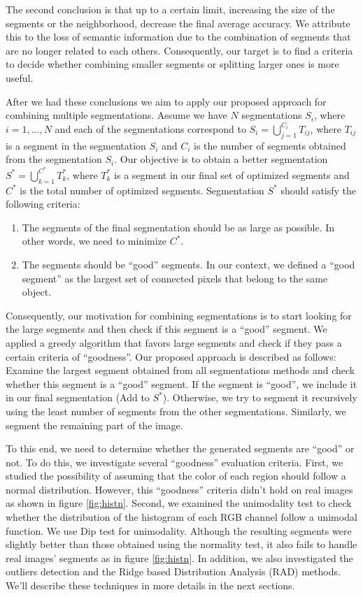 \documentclass{llncs}
\begin{document}
The second conclusion is that up to a certain limit, increasing the size of the segments or the neighborhood,
decrease the final average accuracy. We attribute this to the loss of semantic information due to the combination
of segments that are no longer related to each others. Consequently, our target is to find a criteria to decide
whether combining smaller segments or splitting larger ones is more useful.

After we had these conclusions we aim to apply our proposed approach for combining multiple segmentations.
Assume we have $N$ segmentations $S_i$, where $i = 1, ..., N$ and each of the segmentations correspond to
$S_i = \bigcup_{j=1}^{C_i}T_{ij}$, where $T_{ij}$ is a segment in the segmentation $S_i$ and $C_i$ is the number
of segments obtained from the segmentation $S_i$. Our objective is to obtain a better segmentation
$S^* = \bigcup_{k=1}^{C^*}T_k^*$, where $T^*_k$ is a segment in our final set of optimized segments and
$C^*$ is the total number of optimized segments. Segmentation $S^*$ should satisfy the following criteria:

\begin{enumerate}
\item
The segments of the final segmentation should be as large as possible. In other words, we need to minimize $C^*$.
\item
The segments should be ``good'' segments. In our context, we defined a ``good segment'' as the largest set of
connected pixels that belong to the same object.
\end{enumerate}

Consequently, our motivation for combining segmentations is to start looking for the large segments and then check
if this segment is a ``good'' segment. We applied a greedy algorithm that favors large segments and check if they pass a
certain criteria of ``goodness''.
Our proposed approach is described as follows: Examine the largest segment obtained from all segmentations methods and
check whether this segment is a ``good'' segment. If the segment is ``good'', we include it in our final segmentation
(Add to $S^*$). Otherwise, we try to segment it recursively using the least number of segments from the other segmentations.
Similarly, we segment the remaining part of the image.

To this end, we need to determine whether the generated segments are ``good'' or not. To do this, we investigate several
``goodness'' evaluation criteria. First, we studied the possibility of assuming that the color of each region should follow
a normal distribution. However, this ``goodness'' criteria didn't hold on real images as shown in figure \ref{fig:histn}.
Second, we examined the unimodality test to check whether the distribution of the histogram of each RGB channel follow a
unimodal function. We use Dip test \cite{dip-unimodality} for unimodality. Although the resulting segments were slightly
better than those obtained using the normality test, it also fails to handle real images' segments as in figure \ref{fig:histn}.
In addition, we also investigated the outliers detection and the Ridge based Distribution Analysis (RAD) methods.
We'll describe these techniques in more details in the next sections.
\end{document}
